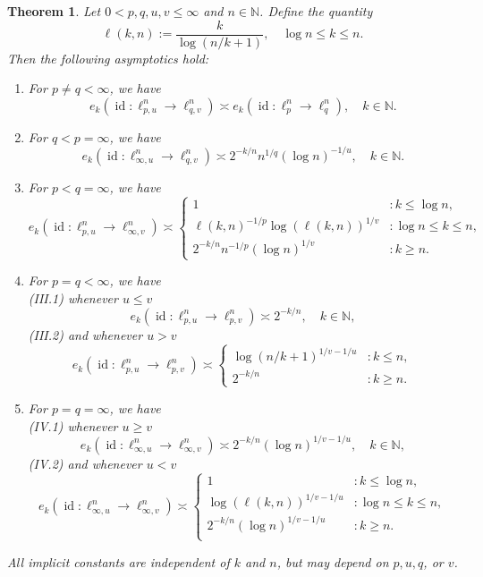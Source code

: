\documentclass[a4paper,12pt]{article}
\newtheorem{thm}{Theorem}
\theoremstyle{definition}
\newcommand{\IN}{\mathbb{N}}
\DeclareMathOperator{\id}{id}
\begin{document}
\begin{thm}\label{thm:main}
	Let $0<p,q,u,v\le \infty$ and $n\in\IN$. Define the quantity
	\[
	\ell(k,n):=\frac{k}{\log(n/k+1)},\quad \log n\le k \le n.
	\]
	Then the following asymptotics hold:
	\begin{enumerate}
		\item[\emph{(0)}] For $p\neq q<\infty$, we have
		\[
		e_k(\id\colon \ell_{p,u}^n\to\ell_{q,v}^n)\asymp e_k(\id\colon \ell_{p}^n\to\ell_{q}^n), \quad k\in\IN.
		\]
	\item[\emph{(I)}] For $q<p=\infty$, we have
			\[
			e_k(\id\colon \ell_{\infty,u}^n\to \ell_{q,v}^n)
			\asymp 2^{-k/n}n^{1/q}(\log n)^{-1/u},\quad k\in\IN.
			\]
	\item[\emph{(II)}] For $p<q=\infty$, we have 
			\[
			e_k(\id\colon \ell_{p,u}^n\to \ell_{\infty,v}^n)
			\asymp 
			\begin{cases}
				1&\colon k\le \log n,\\
				\ell(k,n)^{-1/p}\log(\ell(k,n))^{1/v}&\colon \log n\le k\le n,\\
				2^{-k/n}n^{-1/p}(\log n)^{1/v}&\colon  k\ge n.
			\end{cases}
			\]
		\item[{\emph{(III)}}] For $p=q<\infty$, we have \\
			{\emph{(III.1)}} whenever $u\le v$
			\[
			e_k(\id\colon \ell_{p,u}^n\to \ell_{p,v}^n)
			\asymp 2^{-k/n},\quad k\in \IN,
			\]
			{\emph{(III.2)}} and whenever $u>v$
			\[
			e_k(\id\colon \ell_{p,u}^n\to \ell_{p,v}^n)
			\asymp
			\begin{cases}
				\log(n/k+1)^{1/v-1/u}&\colon  k\le n,\\
				2^{-k/n}&\colon  k\ge n.
			\end{cases}
			\]
	\item[\emph{(IV)}] For $p=q=\infty$, we have \\
		{\emph{(IV.1)}} whenever $u\ge v$ 
			\[
			e_k(\id\colon \ell_{\infty,u}^n\to \ell_{\infty,v}^n)
			\asymp 2^{-k/n}(\log n)^{1/v-1/u},\quad k\in \IN,
			\]
			{\emph{(IV.2)}} and whenever $u<v$ 
			\[
			e_k(\id\colon \ell_{\infty,u}^n\to \ell_{\infty,v}^n)
			\asymp 
			\begin{cases}
			1&\colon 	 k\le \log n,\\
			\log(\ell(k,n))^{1/v-1/u}&\colon 	\log n\le k\le n,\\
			2^{-k/n}(\log n)^{1/v-1/u}&\colon 	k\ge  n.\\
			\end{cases}
			\]
	\end{enumerate}
	All implicit constants are independent of $k$ and $n$, but may depend on $p,u,q$, or $v$.
\end{thm}
\end{document}
